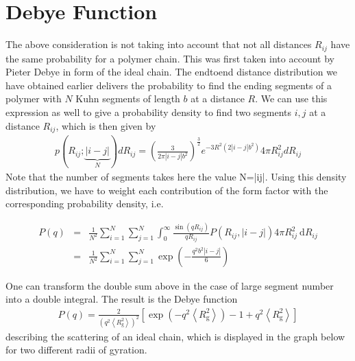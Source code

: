 \documentclass[letterpaper,10pt,english]{sphinxmanual}
\begin{document}
\section{Debye Function}
\label{\detokenize{notebooks/L23/1_Scattering:Debye-Function}}
\sphinxAtStartPar
The above consideration is not taking into account that not all distances \(R_{ij}\) have the same probability for a polymer chain. This was first taken into account by Pieter Debye in form of the ideal chain. The end\sphinxhyphen{}to\sphinxhyphen{}end distance distribution we have obtained earlier delivers the probability to find the ending segments of a polymer with \(N\) Kuhn segments of length \(b\) at a distance \(R\). We can use this expression as well to give a probability density to find two
segments \(i,j\) at a distance \(R_{ij}\), which is then given by
\begin{equation*}
\begin{split}p(R_{i j} ; \underbrace{|i-j|}_{N}) d R_{i j}=\left(\frac{3}{2 \pi|i-j| b^{2}}\right)^{\frac{3}{2}} e^{-3 R^{2}\left(2|i-j| b^{2}\right)} 4 \pi R_{i j}^{2} d R_{i j}\end{split}
\end{equation*}
\sphinxAtStartPar
Note that the number of segments takes here the value N=|i\sphinxhyphen{}j|. Using this density distribution, we have to weight each contribution of the form factor with the corresponding probability density, i.e.

\sphinxAtStartPar
\begin{eqnarray}
P(q)&=&\frac{1}{N^{2}} \sum_{i=1}^{N} \sum_{j=1}^{N} \int_{0}^{\infty} \frac{\sin \left(q R_{i j}\right)}{q R_{i j}} P\left(R_{i j},|i-j|\right) 4 \pi R_{i j}^{2} \mathrm{~d} R_{i j}\\
&=&\frac{1}{N^{2}} \sum_{i=1}^{N} \sum_{j=1}^{N} \exp \left(-\frac{q^{2} b^{2}|i-j|}{6}\right)
\end{eqnarray}

\sphinxAtStartPar
One can transform the double sum above in the case of large segment number into a double integral. The result is the Debye function
\begin{equation*}
\begin{split}P(q)=\frac{2}{\left(q^{2}\left\langle R_{\mathrm{g}}^{2}\right\rangle\right)^{2}}\left[\exp \left(-q^{2}\left\langle R_{\mathrm{g}}^{2}\right\rangle\right)-1+q^{2}\left\langle R_{\mathrm{g}}^{2}\right\rangle\right]\tag{Debye function}\end{split}
\end{equation*}
\sphinxAtStartPar
describing the scattering of an ideal chain, which is displayed in the graph below for two different radii of gyration.
\end{document}
